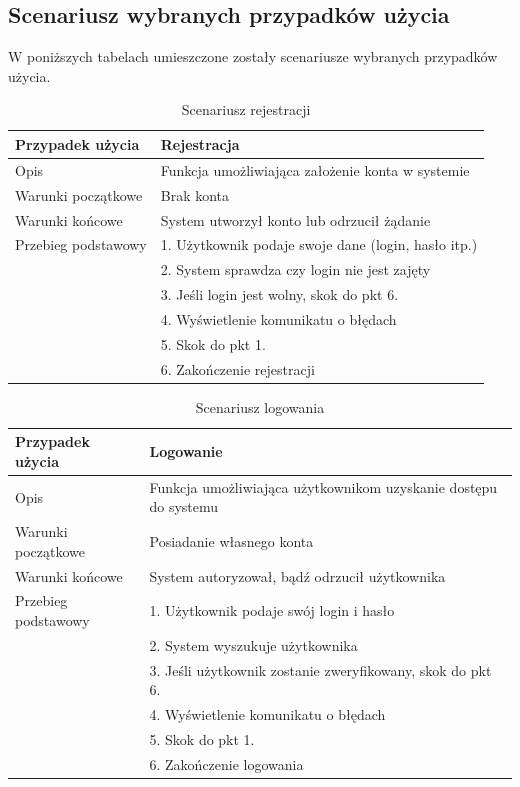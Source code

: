 \subsection{Scenariusz wybranych przypadków użycia}

W poniższych tabelach umieszczone zostały scenariusze wybranych przypadków użycia.

\begin{table}[H]
	\begin{tabularx}{\textwidth}{ |l|X| }
		\hline 
		Przypadek użycia & Rejestracja  \\ 
		\hline 
		Opis & Funkcja umożliwiająca założenie konta w systemie \\ 
		\hline 
		Warunki początkowe & Brak konta \\ 
		\hline 
		Warunki końcowe & System utworzył konto lub odrzucił żądanie  \\ 
		\hline 
		Przebieg podstawowy & 1. Użytkownik podaje swoje dane (login, hasło itp.) \\ 
		& 2. System sprawdza czy login nie jest zajęty \\
		& 3. Jeśli login jest wolny, skok do pkt 6. \\
		& 4. Wyświetlenie komunikatu o błędach \\
		& 5. Skok do pkt 1. \\
		& 6. Zakończenie rejestracji \\
		\hline 
	\end{tabularx} 
    \caption{Scenariusz rejestracji}
\label{tab:scen1}   
\end{table}

\begin{table}[H]
	\begin{tabularx}{\textwidth}{ |l|X| }
		\hline 
		Przypadek użycia & Logowanie  \\ 
		\hline 
		Opis & Funkcja umożliwiająca użytkownikom uzyskanie dostępu do systemu \\ 
		\hline 
		Warunki początkowe & Posiadanie własnego konta \\ 
		\hline 
		Warunki końcowe & System autoryzował, bądź odrzucił użytkownika  \\ 
		\hline 
		Przebieg podstawowy & 1. Użytkownik podaje swój login i hasło \\ 
		& 2. System wyszukuje użytkownika \\
		& 3. Jeśli użytkownik zostanie zweryfikowany, skok do pkt 6. \\
		& 4. Wyświetlenie komunikatu o błędach \\
		& 5. Skok do pkt 1. \\
		& 6. Zakończenie logowania \\
		\hline 
	\end{tabularx} 
	\caption{Scenariusz logowania}
	\label{tab:scen2}   
\end{table}

